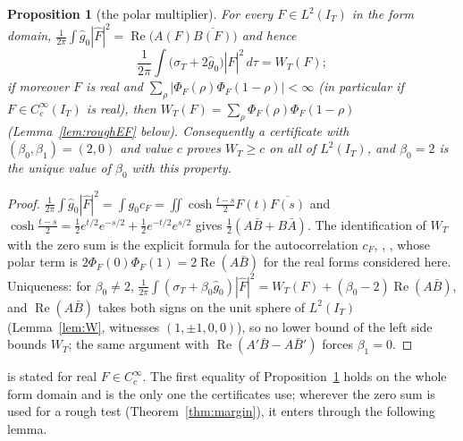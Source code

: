 \documentclass[10pt]{amsart}
\newtheorem{proposition}[theorem]{Proposition}
\theoremstyle{definition}
\theoremstyle{remark}
\newcommand{\Rel}{\operatorname{Re}}
\newcommand{\IT}{I_T}
\newcommand{\sT}{\sigma_T}
\newcommand{\gh}[1]{\widehat g_{#1}}
\newcommand{\Fh}{\widehat F}
\newcommand{\cF}{c_F}
\begin{document}
\begin{proposition}[the polar multiplier]\label{prop:P}
For every $F\in L^2(\IT)$ in the form domain,
$\frac1{2\pi}\int\gh0|\Fh|^2=\Rel\big(A(F)\overline{B(F)}\big)$ and hence
\[
\frac1{2\pi}\int\big(\sT+2\gh0\big)|\Fh|^2\,d\tau=W_T(F);
\]
if moreover $F$ is real and $\sum_\rho|\Phi_F(\rho)\Phi_F(1-\rho)|<\infty$ (in particular if
$F\in C_c^\infty(\IT)$ is real), then $W_T(F)=\sum_\rho\Phi_F(\rho)\Phi_F(1-\rho)$
(Lemma~\ref{lem:roughEF} below).
Consequently a certificate with $(\beta_0,\beta_1)=(2,0)$ and value $c$ proves $W_T\ge c$ on all
of $L^2(\IT)$, and $\beta_0=2$ is the unique value of $\beta_0$ with this property.
\end{proposition}
\begin{proof}
$\frac1{2\pi}\int\gh0|\Fh|^2=\int g_0\cF=\iint\cosh\frac{t-s}2F(t)\overline{F(s)}$ and
$\cosh\frac{t-s}2=\frac12e^{t/2}e^{-s/2}+\frac12e^{-t/2}e^{s/2}$ gives $\frac12(A\bar B+B\bar A)$.
The identification of $W_T$ with the zero sum is the explicit formula for the autocorrelation
$\cF$, \cite{Weil52,Bombieri2000}, \cite[Theorem~3.3]{Paper45}, whose polar term is
$2\Phi_F(0)\Phi_F(1)=2\Rel(A\bar B)$ for the real forms considered here. Uniqueness: for
$\beta_0\ne2$, $\frac1{2\pi}\int(\sT+\beta_0\gh0)|\Fh|^2=W_T(F)+(\beta_0-2)\Rel(A\bar B)$, and
$\Rel(A\bar B)$ takes both signs on the unit sphere of $L^2(\IT)$ (Lemma~\ref{lem:W}, witnesses
$(1,\pm1,0,0)$), so no lower bound of the left side bounds $W_T$; the same argument with
$\Rel(A'\bar B-A\bar B')$ forces $\beta_1=0$.
\end{proof}

\cite[Theorem~3.3]{Paper45} is stated for real $F\in C_c^\infty$. The first equality of
Proposition~\ref{prop:P} holds on the whole form domain and is the only one the certificates use;
wherever the zero sum is used for a rough test (Theorem~\ref{thm:margin}), it enters through the
following lemma.
\end{document}
